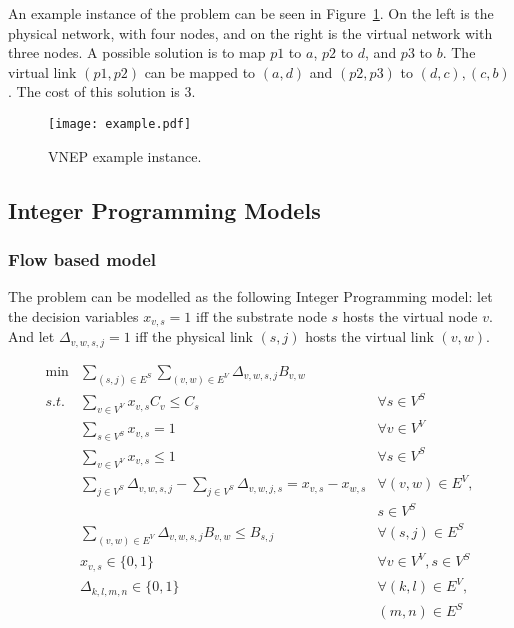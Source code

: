 An example instance of the problem can be seen in Figure~\ref{fig:auxcex}. On the left is the physical network, with four nodes, and on the right is the virtual network with three nodes. A possible solution is to map $p1$ to $a$, $p2$ to $d$, and $p3$ to $b$. The virtual link $(p1,p2)$ can be mapped to $(a,d)$ and $(p2,p3)$ to $(d,c),(c,b)$. The cost of this solution is $3$.

\begin{figure}[h]
  \centering
  \texttt{[image: example.pdf]}
  \caption{VNEP example instance.\label{fig:auxcex}}
\end{figure}

\subsection{Integer Programming Models}
\subsubsection{Flow based model}
The problem can be modelled as the following Integer Programming model: let the decision variables $x_{v,s} = 1$ iff the substrate node $s$ hosts the virtual node $v$. And let $\Delta_{v,w,s,j} = 1$ iff the physical link $(s,j)$ hosts the virtual link $(v,w)$.

\begin{align}
    \min & \sum\limits_{(s,j) \in E^{S}} \sum\limits_{(v,w) \in E^{V}} \Delta_{v,w,s,j} B_{v,w} \nonumber \\
    s.t. & \sum\limits_{v \in V^{V}} x_{v,s} C_{v} \leq C_{s}                     & \forall s \in V^{S}  \label{eq:cap} \\
    & \sum\limits_{s \in V^{S}} x_{v,s} = 1                                  & \forall v \in V^{V}  \label{eq:virone}\\
         & \sum\limits_{v \in V^{V}} x_{v,s} \leq 1                               & \forall s \in V^{S} \label{eq:subone}\\
         & \sum\limits_{j \in V^{S}} \Delta_{v,w,s,j} - \sum\limits_{j \in V^{S}} \Delta_{v,w,j,s} = x_{v,s} - x_{w,s}  & \forall (v,w) \in E^{V}, \label{eq:flow} \\
         & & s \in V^{S} \nonumber \\
         & \sum\limits_{(v,w) \in E^{V}} \Delta_{v,w,s,j} B_{v,w} \leq B_{s,j}  & \forall (s,j) \in E^{S} \label{eq:bandwidth} \\
         & x_{v,s} \in \{0,1\} & \forall v \in V^{V}, s \in V^{S} \\
         & \Delta_{k,l,m,n} \in \{0,1\} & \forall (k,l) \in E^{V}, \\
         & & (m,n) \in E^{S} \nonumber
\end{align} 

